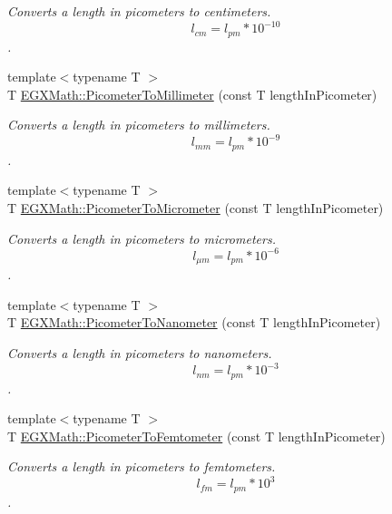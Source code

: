 \begin{DoxyCompactItemize}
\begin{DoxyCompactList}\small\item\em Converts a length in picometers to centimeters. \[ l_{cm}=l_{pm} * 10^{-10} \]. \end{DoxyCompactList}\item 
{\footnotesize template$<$typename T $>$ }\\T \mbox{\hyperlink{group___e_g_x_math-_conversions-_length_conversions-_picometer-_s_i_gac6c5e481bf86b5c0d2ed7fa6a06a4c8e}{E\+G\+X\+Math\+::\+Picometer\+To\+Millimeter}} (const T length\+In\+Picometer)
\begin{DoxyCompactList}\small\item\em Converts a length in picometers to millimeters. \[ l_{mm}=l_{pm} * 10^{-9} \]. \end{DoxyCompactList}\item 
{\footnotesize template$<$typename T $>$ }\\T \mbox{\hyperlink{group___e_g_x_math-_conversions-_length_conversions-_picometer-_s_i_gacf7ccbf7130894f8a9075cb9fd66c67d}{E\+G\+X\+Math\+::\+Picometer\+To\+Micrometer}} (const T length\+In\+Picometer)
\begin{DoxyCompactList}\small\item\em Converts a length in picometers to micrometers. \[ l_{\mu m}=l_{pm} * 10^{-6} \]. \end{DoxyCompactList}\item 
{\footnotesize template$<$typename T $>$ }\\T \mbox{\hyperlink{group___e_g_x_math-_conversions-_length_conversions-_picometer-_s_i_gace426a434c0521d391fd15260e33d9f0}{E\+G\+X\+Math\+::\+Picometer\+To\+Nanometer}} (const T length\+In\+Picometer)
\begin{DoxyCompactList}\small\item\em Converts a length in picometers to nanometers. \[ l_{nm}=l_{pm} * 10^{-3} \]. \end{DoxyCompactList}\item 
{\footnotesize template$<$typename T $>$ }\\T \mbox{\hyperlink{group___e_g_x_math-_conversions-_length_conversions-_picometer-_s_i_gabdc7e9ceb6baa9da4cee4b791084fb2a}{E\+G\+X\+Math\+::\+Picometer\+To\+Femtometer}} (const T length\+In\+Picometer)
\begin{DoxyCompactList}\small\item\em Converts a length in picometers to femtometers. \[ l_{fm}=l_{pm} * 10^{3} \]. \end{DoxyCompactList}\item 

\end{DoxyCompactItemize}
